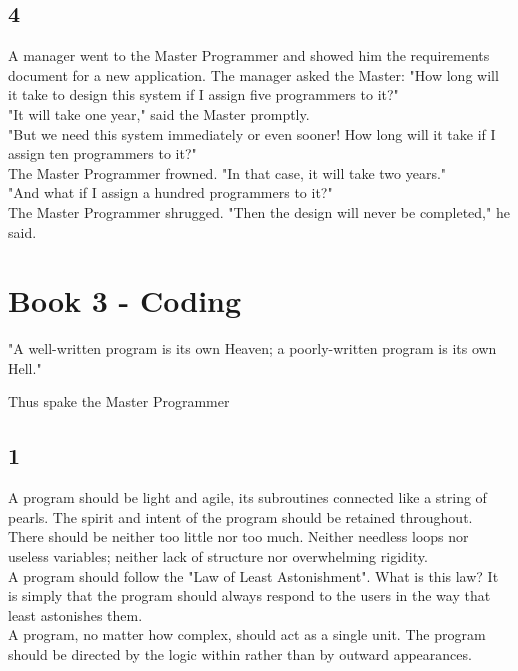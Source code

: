 \documentclass[14pt, letterpaper]{book}
\begin{document}
\section*{4}
A manager went to the Master Programmer and showed him the requirements document for a new application. The manager asked the Master: "How long will it take to design this system if I assign five programmers to it?"\\

"It will take one year," said the Master promptly.\\

"But we need this system immediately or even sooner! How long will it take if I assign ten programmers to it?"\\

The Master Programmer frowned. "In that case, it will take two years."\\

"And what if I assign a hundred programmers to it?"\\

The Master Programmer shrugged. "Then the design will never be completed," he said.\\

\chapter*{Book 3 - Coding}
\epigraph{"A well-written program is its own Heaven; a poorly-written program is its own Hell."}{Thus spake the Master Programmer}

\section*{1}
A program should be light and agile, its subroutines connected like a string of pearls. The spirit and intent of the program should be retained throughout. There should be neither too little nor too much. Neither needless loops nor useless variables; neither lack of structure nor overwhelming rigidity.\\

A program should follow the "Law of Least Astonishment". What is this law? It is simply that the program should always respond to the users in the way that least astonishes them.\\

A program, no matter how complex, should act as a single unit. The program should be directed by the logic within rather than by outward appearances.\\
\end{document}
